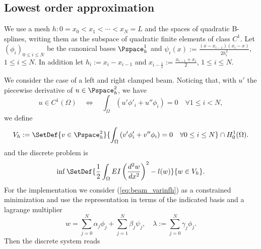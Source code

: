 \subsection{Lowest order approximation}\label{subsec:}
%
We use a mesh $h:0=x_0<x_1<\cdots< x_N=L$ and the spaces of quadratic B-splines, writing them as the subspace of quadratic finite elements of class $C^1$. Let $(\phi_i)_{0\le i\le N}$ be the canonical bases $\Pspace^1_h$ and $\psi_i(x):=\frac{(x-x_{i-1})(x_i-x)}{2h_i^2}$, $1\le i\le N$.
In addition let $h_i:=x_i-x_{i-1}$ and $x_{i-\frac12}:= \frac{x_{i-1}+x_{i}}{2}$, $1\le i\le N$.

We consider the case of a left and right clamped beam. Noticing that, with $u'$ the piecewise derivative of $u\in \Pspace^2_h$, we have
%
\begin{equation}\label{eq:beam_C1P2}
u\in C^1(\Omega) \quad\Leftrightarrow\quad \int_{\Omega} \left(u'\phi'_i + u''\phi_i\right)=0 \quad\forall 1\le i< N,
\end{equation}
%
we define
%
\begin{equation}\label{eq:beam_Vh}
V_h := \SetDef{v\in \Pspace^2_h}{\int_{\Omega} \left(v'\phi'_i + v''\phi_i\right)=0 \quad\forall 0\le i\le N}\cap H^1_0(\Omega).
\end{equation}
%
and the discrete problem is
%
\begin{equation}\label{eq:beam_varinfh}
\inf\SetDef{\frac12\int_{\Omega}EI \left(\frac{d^2 w}{dx^2}\right)^2 - l(w)}{w\in V_h}.
\end{equation}
%
For the implementation we consider (\ref{eq:beam_varinfh}) as a constrained minimization and use the representation in terms of the indicated basis and a lagrange multiplier
%
\begin{equation}\label{eq:}
w = \sum_{j=0}^N \alpha_j \phi_j +  \sum_{j=1}^N \beta_j \psi_j,\quad \lambda := \sum_{j=0}^N \gamma_j \phi_j.
\end{equation}
%
Then the discrete system reads
%
